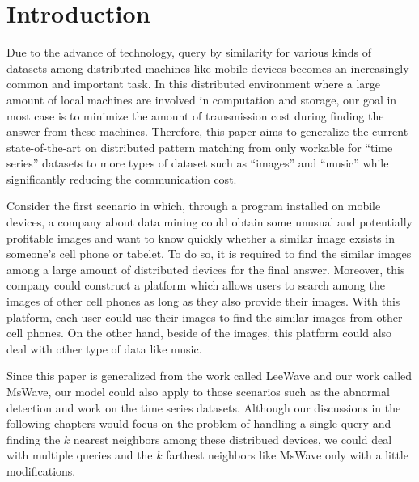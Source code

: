 \chapter{Introduction}
\label{c:intro}

Due to the advance of technology, query by similarity for various kinds of datasets among distributed machines like mobile devices becomes an increasingly common and important task.  In this distributed environment where a large amount of local machines are involved in computation and storage, our goal in most case is to minimize the amount of transmission cost during finding the answer from these machines.  Therefore, this paper aims to generalize the current state-of-the-art on distributed pattern matching from only workable for ``time series''  datasets to more types of dataset such as ``images'' and ``music'' while significantly reducing the communication cost.

Consider the first scenario in which, through a program installed on mobile devices, a company about data mining could obtain some unusual and potentially profitable images and want to know quickly whether a similar image exsists in someone's cell phone or tabelet.  To do so, it is required to find the similar images among a large amount of distributed devices for the final answer.  Moreover, this company could construct a platform which allows users to search among the images of other cell phones as long as they also provide their images.  With this platform, each user could use their images to find the similar images from other cell phones.  On the other hand, beside of the images, this platform could also deal with other type of data like music.  

Since this paper is generalized from the work \cite{LeeWave} called LeeWave and our work \cite{MsWave} called MsWave, our model could also apply to those scenarios such as the abnormal detection and work on the time series datasets. Although our discussions in the following chapters would focus on the problem of handling a single query and finding the $k$ nearest neighbors among these distribued devices, we could deal with multiple queries and the $k$ farthest neighbors like MsWave only with a little modifications.

